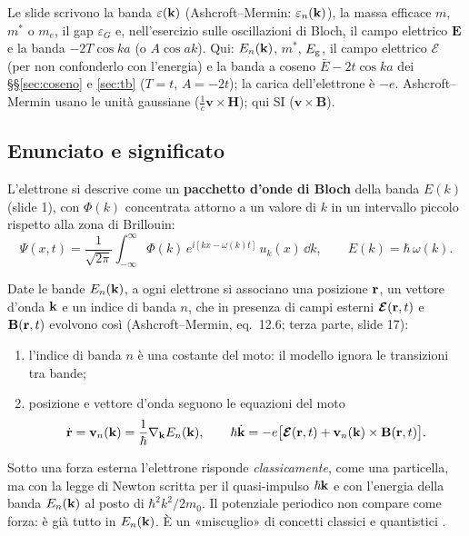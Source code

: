 \documentclass[11pt,a4paper]{article}
\begin{document}
\begin{osservazione}[notazione]
Le slide scrivono la banda $\varepsilon(\mathbf k)$ (Ashcroft--Mermin: $\varepsilon_n(\mathbf k)$), la massa efficace $m$, $m^*$ o $m_e$, il gap $\varepsilon_G$ e,
nell'esercizio sulle oscillazioni di Bloch, il campo elettrico $\mathbf E$ e la banda $-2T\cos ka$ (o $A\cos ak$). Qui: $E_n(\mathbf k)$, $m^*$, $E_{\mathrm g}$, il
campo elettrico $\boldsymbol{\mathcal E}$ (per non confonderlo con l'energia) e la banda a coseno $\bar E-2t\cos ka$ dei §§\ref{sec:coseno} e
\ref{sec:tb} ($T=t$, $A=-2t$); la carica dell'elettrone è $-e$. Ashcroft--Mermin usano le unità gaussiane ($\frac1c\mathbf v\times\mathbf H$); qui
SI ($\mathbf v\times\mathbf B$).
\end{osservazione}

\subsection{Enunciato e significato}
L'elettrone si descrive come un \textbf{pacchetto d'onde di Bloch} della banda $E(k)$ (slide 1), con $\Phi(k)$ concentrata attorno a un valore di $k$
in un intervallo piccolo rispetto alla zona di Brillouin:
\[
\Psi(x,t)=\frac1{\sqrt{2\pi}}\int_{-\infty}^{\infty}\Phi(k)\,e^{i[kx-\omega(k)t]}\,u_k(x)\,\dd k,\qquad E(k)=\hbar\,\omega(k).
\]
\begin{modello}[semiclassico]\label{mod:semicl}
Date le bande $E_n(\mathbf k)$, a ogni elettrone si associano una posizione $\mathbf r$, un vettore d'onda $\mathbf k$ e un indice di banda $n$, che in presenza di campi
esterni $\boldsymbol{\mathcal E}(\mathbf r,t)$ e $\mathbf B(\mathbf r,t)$ evolvono così (Ashcroft--Mermin, eq.~12.6; terza parte, slide 17):
\begin{enumerate}[leftmargin=*, label=\arabic*.]
\item l'indice di banda $n$ è una costante del moto: il modello ignora le transizioni tra bande;
\item posizione e vettore d'onda seguono le equazioni del moto
\[
\dot{\mathbf r}=\mathbf v_n(\mathbf k)=\frac1\hbar\nabla_{\mathbf k}E_n(\mathbf k),\qquad
\hbar\dot{\mathbf k}=-e\bigl[\boldsymbol{\mathcal E}(\mathbf r,t)+\mathbf v_n(\mathbf k)\times\mathbf B(\mathbf r,t)\bigr].
\]
\end{enumerate}
\tcblower
Sotto una forza esterna l'elettrone risponde \emph{classicamente}, come una particella, ma con la legge di Newton scritta per il quasi-impulso
$\hbar\mathbf k$ e con l'energia della banda $E_n(\mathbf k)$ al posto di $\hbar^2k^2/2m_0$. Il potenziale periodico non compare come forza: è già tutto in
$E_n(\mathbf k)$. È un «miscuglio» di concetti classici e quantistici .
\end{modello}
\end{document}
